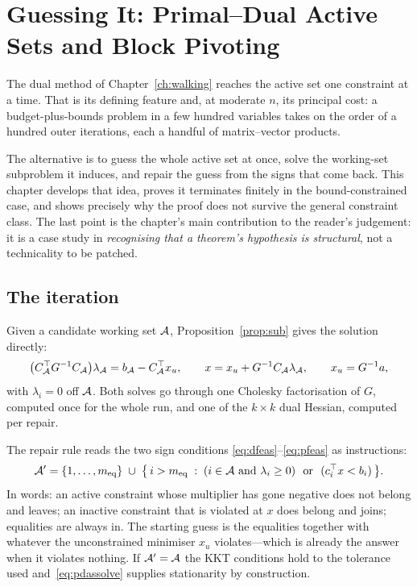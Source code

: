\chapter{Guessing It: Primal--Dual Active Sets and Block Pivoting}
\label{ch:guessing}

The dual method of Chapter~\ref{ch:walking} reaches the active set one constraint
at a time. That is its defining feature and, at moderate $n$, its principal cost: a
budget-plus-bounds problem in a few hundred variables takes on the order of a
hundred outer iterations, each a handful of matrix--vector products.

The alternative is to guess the whole active set at once, solve the working-set
subproblem it induces, and repair the guess from the signs that come back. This
chapter develops that idea, proves it terminates finitely in the bound-constrained
case, and shows precisely why the proof does not survive the general constraint
class. The last point is the chapter's main contribution to the reader's judgement:
it is a case study in \emph{recognising that a theorem's hypothesis is structural},
not a technicality to be patched.

\section{The iteration}

Given a candidate working set $\mathcal{A}$, Proposition~\ref{prop:sub} gives the
solution directly:
\begin{equation}
  \bigl(C_{\mathcal{A}}^{\top} G^{-1} C_{\mathcal{A}}\bigr)\lambda_{\mathcal{A}}
   = b_{\mathcal{A}} - C_{\mathcal{A}}^{\top} x_u,
  \qquad
  x = x_u + G^{-1}C_{\mathcal{A}} \lambda_{\mathcal{A}},
  \qquad x_u = G^{-1}a,
  \label{eq:pdassolve}
\end{equation}
with $\lambda_i = 0$ off $\mathcal{A}$. Both solves go through one Cholesky
factorisation of $G$, computed once for the whole run, and one of the $k\times k$
dual Hessian, computed per repair.

The repair rule reads the two sign conditions
\eqref{eq:dfeas}--\eqref{eq:pfeas} as instructions:
\begin{equation}
  \mathcal{A}' = \{1,\dots,m_{\mathrm{eq}}\} \;\cup\;
  \bigl\{\, i > m_{\mathrm{eq}} \;:\;
    (i \in \mathcal{A} \text{ and } \lambda_i \ge 0)
    \ \text{ or }\
    (c_i^{\top} x < b_i) \,\bigr\}.
  \label{eq:repair}
\end{equation}
In words: an active constraint whose multiplier has gone negative does not belong
and leaves; an inactive constraint that is violated at $x$ does belong and joins;
equalities are always in. The starting guess is the equalities together with
whatever the unconstrained minimiser $x_u$ violates---which is already the answer
when it violates nothing. If $\mathcal{A}' = \mathcal{A}$ the KKT conditions hold to the
tolerance used and~\eqref{eq:pdassolve} supplies stationarity by construction.

